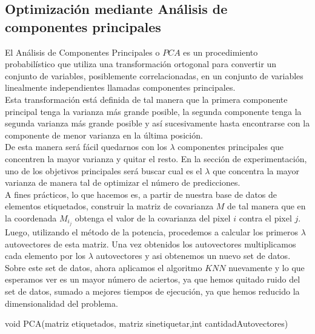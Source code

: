 \subsection{Optimización mediante Análisis de componentes principales}
El Análisis de Componentes Principales o $PCA$ es un procedimiento probabilístico que utiliza una transformación ortogonal para convertir un conjunto de variables, posiblemente correlacionadas, en un conjunto de variables linealmente independientes llamadas componentes principales.
\\
Esta transformación está definida de tal manera que la primera componente principal tenga la varianza más grande posible, la segunda componente tenga la segunda varianza más grande posible y así sucesivamente hasta encontrarse con la componente de menor varianza en la última posición.
\\
De esta manera será fácil quedarnos con los $\lambda$ componentes principales que concentren la mayor varianza y quitar el resto. En la sección de experimentación, uno de los objetivos principales será buscar cual es el $\lambda$ que concentra la mayor varianza de manera tal de optimizar el número de predicciones. 
\\
A fines prácticos, lo que hacemos es, a partir de nuestra base de datos de elementos etiquetados, construir la matriz de covarianza $M$ de tal manera que en la coordenada $M_i_j$ obtenga el valor de la covarianza del pixel $i$ contra el pixel $j$.
\\
Luego, utilizando el método de la potencia, procedemos a calcular los primeros $\lambda$ autovectores de esta matriz. Una vez obtenidos los autovectores multiplicamos cada elemento por los $\lambda$ autovectores y asi obtenemos un nuevo set de datos.
\\
Sobre este set de datos, ahora aplicamos el algoritmo $KNN$ nuevamente y lo que esperamos ver es un mayor número de aciertos, ya que hemos quitado ruido del set de datos, sumado a mejores tiempos de ejecución, ya que hemos reducido la dimensionalidad del problema.
\\

\begin{algorithm}
\begin{algorithmic}[1]\parskip=1mm
\caption{void PCA(matriz etiquetados, matriz sinetiquetar,int cantidadAutovectores)}
\ENDFOR\\
\end{algorithmic}
\end{algorithm}
\\

